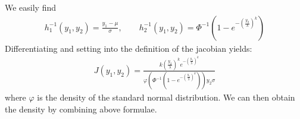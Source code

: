 We easily find
\begin{align}
    h_1^{-1}(y_1, y_2) = \frac{y_1-\mu}{\sigma}, \qquad 
    h_2^{-1}(y_1, y_2) = \Phi^{-1}\left(1-e^{-\left(\frac{y_2}{\lambda}\right)^k}\right) 
\end{align}
Differentiating and setting into the definition of the jacobian yields:
\begin{align}
    J(y_1, y_2) = \frac{k\left(\frac{y_2}{\lambda}\right)^ke^{-\left(\frac{y_2}{\lambda}\right)^k}}{\varphi\left(\Phi^{-1}\left(1-e^{-\left(\frac{y_2}{\lambda}\right)^k}\right)\right)y_2\sigma }    
\end{align}
where $\varphi$ is the density of the standard normal distribution. We can then obtain the density by combining above formulae.